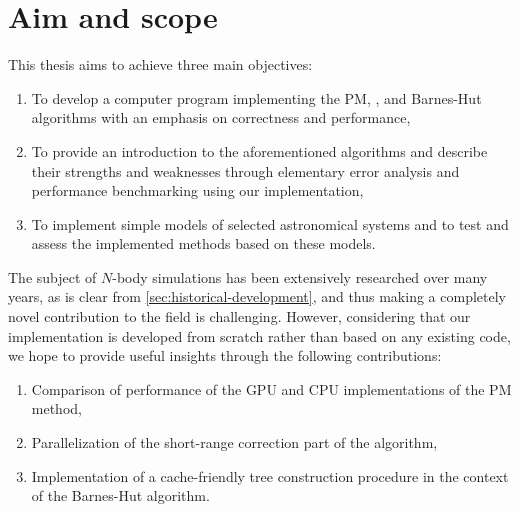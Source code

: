 \section{Aim and scope}
This thesis aims to achieve three main objectives:
\begin{enumerate}
    \item To develop a computer program implementing the PM, \PThreeM{}, and Barnes-Hut algorithms with an emphasis on correctness and performance,
    \item To provide an introduction to the aforementioned algorithms and describe their strengths and weaknesses through elementary error analysis and performance benchmarking using our implementation,
    \item To implement simple models of selected astronomical systems and to test and assess the implemented methods based on these models.
\end{enumerate}
The subject of $N$-body simulations has been extensively researched over many years, as is clear from \autoref{sec:historical-development}, and thus making a completely novel contribution to the field is challenging.
However, considering that our implementation is developed from scratch rather than based on any existing code, we hope to provide useful insights through the following contributions:
\begin{enumerate}
    \item Comparison of performance of the GPU and CPU implementations of the PM method,
    \item Parallelization of the short-range correction part of the \PThreeM{} algorithm,
    \item Implementation of a cache-friendly tree construction procedure in the context of the Barnes-Hut algorithm.
\end{enumerate}